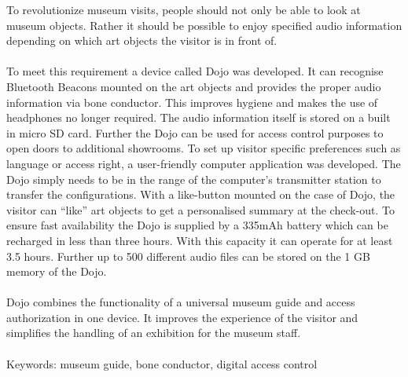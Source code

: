 To revolutionize museum visits, people should not only be able to look at museum objects. Rather it should be possible to enjoy specified audio information depending on which art objects the visitor is in front of.\\\\ To meet this requirement a device called Dojo was developed. It can recognise Bluetooth Beacons mounted on the art objects and provides the proper audio information via bone conductor. This improves hygiene and makes the use of headphones no longer required. The audio information itself is stored on a built in micro SD card. Further the Dojo can be used for access control purposes to open doors to additional showrooms. To set up visitor specific preferences such as language or access right, a user-friendly computer application was developed. The Dojo simply needs to be in the range of the computer's transmitter station to transfer the configurations. With a like-button mounted on the case of Dojo, the visitor can ``like'' art objects to get a personalised summary at the check-out. To ensure fast availability the Dojo is supplied by a 335mAh battery which can be recharged in less than three hours. With this capacity it can operate for at least 3.5 hours. Further up to 500 different audio files can be stored on the 1 GB memory of the Dojo.\\\\ Dojo combines the functionality of a universal museum guide and access authorization in one device. It improves the experience of the visitor and simplifies the handling of an exhibition for the museum staff.\\\\Keywords: museum guide, bone conductor, digital access control
